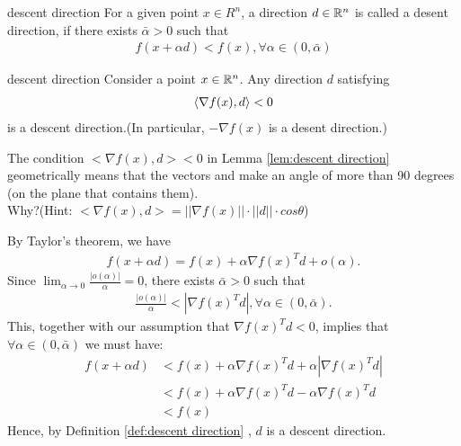 \begin{definition}{}{descent direction}
    For a given point $x\in R^n$, a direction $d\in \mathbb{R}^n$ is called a desent direction, if there exists $\bar{\alpha}>0$ such that
    \begin{align*}
        f(x+\alpha d)<f(x),\forall \alpha\in (0,\bar{\alpha})
    \end{align*}
\end{definition}

\begin{lemma}{}{descent direction}
    {
        Consider a point $x\in \mathbb{R}^n$. Any direction $d$ satisfying
        \begin{align*}
            \langle\nabla f(x),d\rangle<0
        \end{align*}
        is a descent direction.(In particular, $- \nabla f(x)$ is a desent direction.)
    }
\end{lemma}

\begin{remark}
    The condition $<\nabla f(x),d><0$ in Lemma \ref{lem:descent direction} geometrically means that
the vectors and make an angle of more than 90 degrees (on the plane
that contains them). \\
Why?(Hint: $<\nabla f(x),d>=||\nabla f(x)||\cdot ||d||\cdot cos\theta$)
\end{remark}

\begin{proofsolution}
    By Taylor's theorem, we have
    \begin{align*}
        f(x+\alpha d) = f(x) + \alpha \nabla f(x)^T d + o(\alpha).
    \end{align*}
    Since $\lim_{\alpha\rightarrow 0} \frac{|o(\alpha)|}{\alpha}=0$, there exists $\bar{\alpha}>0$ such that
    \begin{align*}
        \frac{|o(\alpha)|}{\alpha}<|\nabla f(x)^Td|,\forall \alpha\in(0,\bar{\alpha}).
    \end{align*}
    This, together with our assumption that $\nabla f(x)^Td<0$, implies that $\forall \alpha\in (0,\bar{\alpha})$ we must have:
    \begin{align*}
        f(x+\alpha d)&<f(x)+\alpha \nabla f(x)^T d + \alpha |\nabla f(x)^Td|\\
                    &<f(x)+\alpha \nabla f(x)^T d - \alpha \nabla f(x)^Td\\
                    &<f(x)
    \end{align*}
    Hence, by Definition \ref{def:descent direction} , $d$ is a descent direction.
\end{proofsolution}

